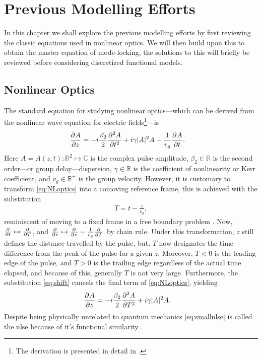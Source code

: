 
\chapter{Previous Modelling Efforts}
In this chapter we shall explore the previous modelling efforts by first reviewing the classic equations used in nonlinear optics. We will then build upon this to obtain the master equation of mode-locking, the solutions to this will briefly be reviewed before considering discretized functional models. \\

\section{Nonlinear Optics}
The standard equation for studying nonlinear optics---which can be derived from the nonlinear wave equation for electric fields\footnote{The derivation is presented in detail in \cite{agrawal2013, ferreira}.}---is
\begin{align}
\pdiff{A}{z} &= - i \frac{\beta_2}{2}\pdiff[2]{A}{t} + i \gamma |A|^2 A - \frac{1}{v_g} \pdiff{A}{t}.
\label{eq:NLoptics}
\end{align}
Here $A = A(z, t) : \mathbb{R}^2 \mapsto \mathbb{C}$ is the complex pulse amplitude, $\beta_2 \in \mathbb{R}$ is the second order---or group delay---dispersion, $\gamma \in \mathbb{R}$ is the coefficient of nonlinearity or Kerr coefficient, and $v_g \in \mathbb{R}^+$ is the group velocity. However, it is customary to transform \eqref{eq:NLoptics} into a comoving reference frame, this is achieved with the substitution
\begin{align}
\label{eq:shift}
T = t - \frac{z}{v_g},
\end{align}
reminiscent of moving to a fixed frame in a free boundary problem \cite{ockendon}. Now, $\frac{\partial^{}}{\partial{t}^{}} \mapsto \frac{\partial^{}}{\partial{T}^{}}$, and $\frac{\partial^{}}{\partial{z}^{}} \mapsto \frac{\partial^{}}{\partial{z}^{}} - \frac{1}{v_g} \frac{\partial^{}}{\partial{T}^{}}$ by chain rule.  Under this transformation, $z$ still defines the distance travelled by the pulse, but, $T$ now designates the time difference from the peak of the pulse for a given $z$. Moreover, $T < 0$ is the leading edge of the pulse, and $T > 0$ is the trailing edge regardless of the actual time elapsed, and because of this, generally $T$ is not very large. Furthermore, the substitution \eqref{eq:shift} cancels the final term of \eqref{eq:NLoptics}, yielding
\begin{align}
\pdiff{A}{z} &= - i \frac{\beta_2}{2}\pdiff[2]{A}{T} + i \gamma |A|^2 A.
\label{eq:smallnlse}
\end{align}
Despite being physically unrelated to quantum mechanics \eqref{eq:smallnlse} is called the \gls{nlse} because of it's functional similarity \cite{agrawal2013, anderson, burgoyne2007, desurvire, ferreira, finot, rothenberg}. \\

